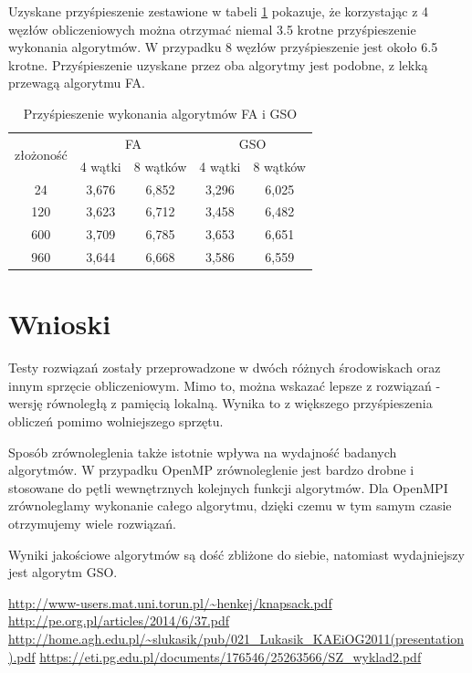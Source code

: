 \documentclass[11pt,a4paper,twoside]{article}
\begin{document}
Uzyskane przyśpieszenie zestawione w tabeli \ref{MPIprzysp} pokazuje, że korzystając z 4 węzłów obliczeniowych można otrzymać niemal 3.5 krotne przyśpieszenie wykonania algorytmów. W przypadku 8 węzłów przyśpieszenie jest około 6.5 krotne. Przyśpieszenie uzyskane przez oba algorytmy jest podobne, z lekką przewagą algorytmu FA.

\bgroup
\def\arraystretch{1.1}
\begin{table}[ht]
\caption{Przyśpieszenie wykonania algorytmów FA i GSO}
\label{MPIprzysp}
\centering
\begin{tabular}{|c||c|c||c|c|}
\hline
 \multirow{2}{*}{złożoność} & \multicolumn{2}{c||}{FA} & \multicolumn{2}{c|}{GSO} \\\cline{2-5}
 & 4 wątki & 8 wątków & 4 wątki & 8 wątków \\\hline
 24 & 3,676 & 6,852 & 3,296 & 6,025\\\hline
 120 & 3,623 & 6,712 & 3,458 & 6,482 \\\hline
 600 & 3,709 & 6,785 & 3,653 & 6,651 \\\hline
 960 & 3,644 & 6,668 & 3,586 & 6,559 \\\hline
\end{tabular}
\end{table}
\egroup
\vspace*{1\baselineskip}

\section{Wnioski}
Testy rozwiązań zostały przeprowadzone w dwóch różnych środowiskach oraz innym sprzęcie obliczeniowym. Mimo to, można wskazać lepsze z  rozwiązań - wersję równoległą z pamięcią lokalną. Wynika to z większego przyśpieszenia obliczeń pomimo wolniejszego sprzętu. 

Sposób zrównoleglenia także istotnie wpływa na wydajność badanych algorytmów. W przypadku OpenMP zrównoleglenie jest bardzo drobne i stosowane do pętli wewnętrznych kolejnych funkcji algorytmów. Dla OpenMPI zrównoleglamy wykonanie całego algorytmu, dzięki czemu w tym samym czasie otrzymujemy wiele rozwiązań. 

Wyniki jakościowe algorytmów są dość zbliżone do siebie, natomiast wydajniejszy jest algorytm GSO.


\begin{thebibliography}{9}
\url{http://www-users.mat.uni.torun.pl/~henkej/knapsack.pdf}
\url{http://pe.org.pl/articles/2014/6/37.pdf}
\url{http://home.agh.edu.pl/~slukasik/pub/021_Lukasik_KAEiOG2011(presentation).pdf}
\url{https://eti.pg.edu.pl/documents/176546/25263566/SZ_wyklad2.pdf}

\end{thebibliography}
\end{document}
